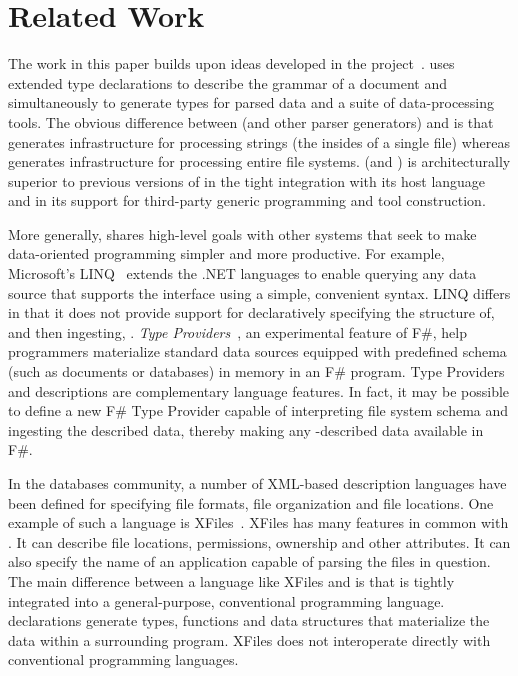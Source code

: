 \section{Related Work}
\label{sec:related}

The work in this paper builds upon ideas developed in the \pads{} 
project~\cite{fisher+:pads,fisher+:toplas}. \pads{} uses extended
type declarations to describe the grammar of a document
and simultaneously to generate types for parsed data and a suite 
of data-processing tools.  The obvious difference between 
\pads{} (and other parser generators) and
\forest{} is that 
\pads{} generates infrastructure for processing strings (the insides
of a single file) whereas \forest{} generates infrastructure for 
processing entire file systems.
\forest{} (and \padshaskell) is architecturally superior to 
previous versions of \pads{} in the tight integration with its host
language and
in its support for third-party generic programming and tool construction.

More generally, \forest{} shares high-level goals with other systems
that seek to make data-oriented programming simpler and more productive.
For example, Microsoft's LINQ~\cite{linq} extends the .NET languages
to enable querying
any data source that supports the  interface using
a simple, convenient syntax.  
LINQ differs in that it does not provide support for
declaratively specifying the structure of, and then ingesting, 
\filestores{}. {\em Type Providers}~\cite{syme+:type-providers}, an
experimental feature 
of F\#, help programmers materialize standard data sources equipped with
predefined schema (such as \xml{} documents or databases) in memory in
an F\# program.  Type Providers and \forest{} descriptions
are complementary language
features.  In fact, it may be possible to define a new F\# Type Provider
capable of interpreting \forest{} file system schema and ingesting
the described data, thereby making any \forest{}-described data available
in F\#.

In the databases community, a number of XML-based
description languages have been defined for specifying
file formats, file organization and file locations.
One example of such a language is XFiles~\cite{xml-file-sys}.
XFiles has many features in common with \forest{}.  It can
describe file locations, permissions, ownership and other
attributes.  It can also specify the name of an application capable of
parsing the files in question.  The main difference between
a language like XFiles and \forest{} is that \forest{} is
tightly integrated into a general-purpose, conventional programming
language.  \forest{} declarations generate types, functions
and data structures that materialize the data within
a surrounding \haskell{} program. XFiles does not interoperate
directly with conventional programming languages. 


